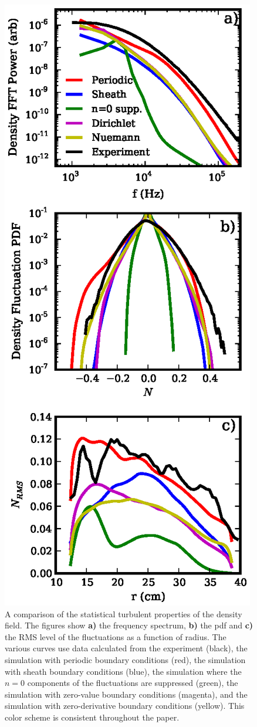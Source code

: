 \documentclass[showpacs,preprintnumbers,amsmath,amssymb,superscriptaddress,aip]{revtex4-1}
\begin{document}
\begin{figure}[!htbp]
\includegraphics[]{statistics}
\hfil
\caption{A comparison of the statistical turbulent properties of the density field. The figures show \textbf{a)} the frequency spectrum, \textbf{b)} the pdf and \textbf{c)} the RMS level
of the fluctuations as a function of radius. The various curves use data calculated from the experiment (black), the simulation with periodic boundary conditions (red), 
the simulation with sheath boundary conditions (blue), the simulation where the $n=0$ components of the fluctuations are suppressed (green), the simulation with zero-value boundary conditions
(magenta), and the simulation with zero-derivative boundary conditions (yellow). This color scheme is consistent throughout the paper.}
\label{statistics}
\end{figure}
\end{document}

